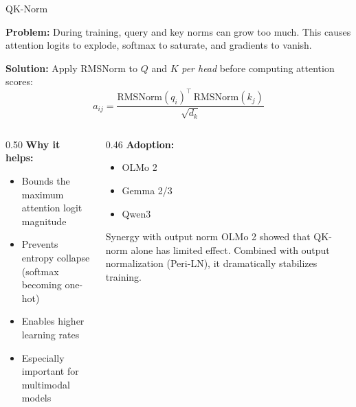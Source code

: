 \begin{frame}{QK-Norm~\cite{henry2020qknorm}}

  \textbf{Problem:} During training, query and key norms can grow too much.
  This causes attention logits to explode, softmax to saturate, and gradients to vanish.

  \vspace{0.3em}
  \textbf{Solution:} Apply RMSNorm to $Q$ and $K$ \emph{per head} before computing attention scores:
  \[
    a_{ij} = \frac{\text{RMSNorm}(q_i)^\top \, \text{RMSNorm}(k_j)}{\sqrt{d_k}}
  \]

  \vspace{0.3em}
  \begin{columns}[T]
    \begin{column}{0.50\textwidth}
      \textbf{Why it helps:}
      \begin{itemize}
        \item Bounds the maximum attention logit magnitude
        \item Prevents entropy collapse (softmax becoming one-hot)
        \item Enables higher learning rates
        \item Especially important for multimodal models
      \end{itemize}
    \end{column}
    \begin{column}{0.46\textwidth}
      \textbf{Adoption:}
      \begin{itemize}
        \item OLMo 2~\cite{walsh2025olmo2}
        \item Gemma 2/3~\cite{team2024gemma2}
        \item Qwen3
      \end{itemize}

      \vspace{0.3em}
      \begin{alertblock}{\small Synergy with output norm}
        OLMo 2 showed that QK-norm alone has limited effect.
        Combined with output normalization (Peri-LN), it dramatically stabilizes training.
      \end{alertblock}
    \end{column}
  \end{columns}
\end{frame}

